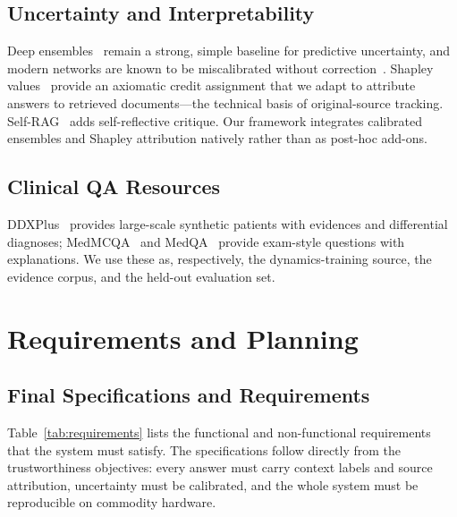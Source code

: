 \documentclass[11pt,a4paper]{report}
\begin{document}
\section{Uncertainty and Interpretability}
Deep ensembles~\cite{lakshminarayanan2017ensembles} remain a strong, simple
baseline for predictive uncertainty, and modern networks are known to be
miscalibrated without correction~\cite{guo2017calibration}. Shapley
values~\cite{shapley1953value,lundberg2017shap} provide an axiomatic credit
assignment that we adapt to attribute answers to retrieved documents---the
technical basis of original-source tracking. Self-RAG~\cite{asai2024selfrag}
adds self-reflective critique. Our framework integrates calibrated ensembles
and Shapley attribution natively rather than as post-hoc add-ons.

\section{Clinical QA Resources}
DDXPlus~\cite{tchango2022ddxplus} provides large-scale synthetic patients with
evidences and differential diagnoses; MedMCQA~\cite{pal2022medmcqa} and
MedQA~\cite{jin2021medqa} provide exam-style questions with explanations. We use
these as, respectively, the dynamics-training source, the evidence corpus, and
the held-out evaluation set.

\chapter{Requirements and Planning}

\section{Final Specifications and Requirements}
Table~\ref{tab:requirements} lists the functional and non-functional
requirements that the system must satisfy. The specifications follow directly
from the trustworthiness objectives: every answer must carry context labels and
source attribution, uncertainty must be calibrated, and the whole system must be
reproducible on commodity hardware.
\end{document}

